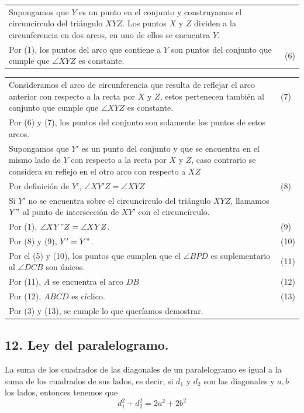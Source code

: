 \documentclass[12pt,a4paper]{article}
\begin{document}
\begin{tabular}{p{15.9 cm} p{1cm}}
\\Supongamos que $Y$ es un punto en el conjunto y construyamos el circuncirculo del triángulo $XYZ$. Los puntos $X$ y $Z$ dividen a la circunferencia en dos arcos, en uno de ellos se encuentra $Y$.
\\Por (1), los puntos del arco que contiene a $Y$ son puntos del conjunto que cumple que $\angle XYZ$ es constante. & \medskip(6)
\end{tabular}
\begin{tabular}{p{15.9 cm} p{1cm}}
\\Consideramos el arco de circunferencia que resulta de reflejar el arco anterior con respecto a la recta por $X$ y $Z$, estos pertenecen también al conjunto que cumple que $\angle XYZ$ es constante.&\medskip\medskip(7)
\\Por (6) y (7), los puntos del conjunto son solamente los puntos de estos arcos.
\\Supongamos que $Y'$ es un punto del conjunto y que se encuentra en el mismo lado de $Y$ con respecto a la recta por $X$ y $Z$, caso contrario se considera su reflejo en el otro arco con respecto a $XZ$
\\Por definición de $Y'$, $\angle XY'Z= \angle XYZ$ & (8)
\\Si $Y'$ no se encuentra sobre el circuncirculo del triángulo $XYZ$, llamamos $Y"$ al punto de intersección de $XY'$ con el circuncírculo.
\\Por (1), $\angle XY"Z= \angle XYZ$. &(9)
\\Por (8) y (9), $Y'=Y"$.&(10)
\\Por el (5) y (10), los puntos que cumplen que el $\angle BPD$ es suplementario al $\angle DCB$ son únicos.&(11)
\\Por (11), $A$ se encuentra el arco $DB$ &(12)
\\Por (12), $ABCD$ es cíclico. &(13)
\\Por (3) y (13), se cumple lo que queríamos demostrar.
\end{tabular}
\subsection*{12. Ley del paralelogramo.}
La suma de los cuadrados de las diagonales de un paralelogramo es igual a la suma de los cuadrados de sus lados, es decir, si $d_1$ y $d_2$ son las diagonales y $a, b$ los lados, entonces tenemos que 
$$d_1^2 + d_2^2=2a^2+2b^2$$
\end{document}
